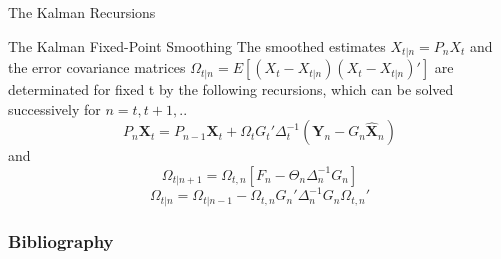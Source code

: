 \documentclass[11pt]{beamer}
\begin{document}
\begin{frame}{The Kalman Recursions   \cite{brockwell2002introduction}}
\small
\begin{alertblock}{The Kalman Fixed-Point Smoothing}
The smoothed estimates $X_{t|n}= P_{n}X_{t}$ and the error covariance matrices $\Omega_{t|n}=E\left[(X_{t}-X_{t|n})(X_{t}-X_{t|n})'\right]$ are determinated for fixed t by the following recursions, which can be solved successively for $n=t,t+1,..$
\begin{equation*}
P_{n}\textbf{X}_{t}=P_{n-1}\textbf{X}_{t}+\Omega_{t}G_{t}'\Delta^{-1}_{t}\left(\textbf{Y}_{n}-G_{n}\hat{\textbf{X}}_{n} \right)
\end{equation*}
and 
\begin{equation*}
\Omega_{t|n+1}=\Omega_{t,n}\left[F_{n}-\Theta_{n}\Delta_{n}^{-1}G_{n} \right]
\end{equation*}
\begin{equation*}
\Omega_{t|n}=\Omega_{t|n-1}-\Omega_{t,n}G_{n}'\Delta_{n}^{-1}G_{n}\Omega_{t,n}'
\end{equation*}
\end{alertblock}
\end{frame}






\begin{frame}
\frametitle{Bibliography}
\printbibliography
\end{frame}
\end{document}
